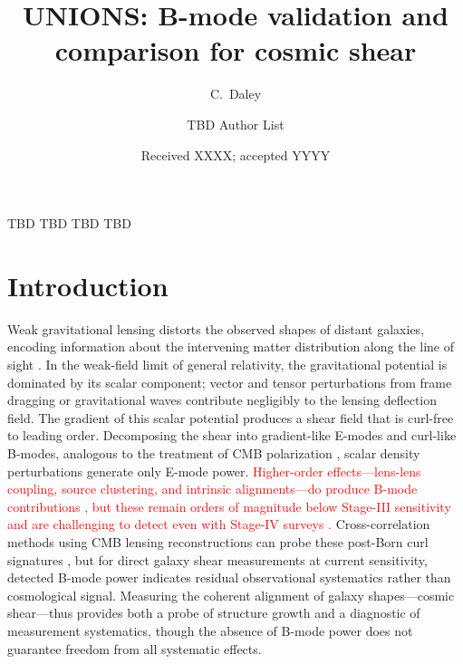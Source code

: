 \documentclass{aa}
\begin{document}
   \title{UNIONS: B-mode validation and comparison for cosmic shear}

   \author{C.~Daley
          \and
          TBD Author List
          }


   \date{Received XXXX; accepted YYYY}

  \abstract
   {TBD}
   {TBD}
   {TBD}
   {TBD}
   {}


   \maketitle
%

\section{Introduction}
Weak gravitational lensing distorts the observed shapes of distant galaxies, encoding information about the intervening matter distribution along the line of sight \citep{bacon.etal00, kaiser.etal00, vanwaerbeke.etal00, wittman.etal00}. In the weak-field limit of general relativity, the gravitational potential is dominated by its scalar component; vector and tensor perturbations from frame dragging or gravitational waves contribute negligibly to the lensing deflection field. The gradient of this scalar potential produces a shear field that is curl-free to leading order. Decomposing the shear into gradient-like E-modes and curl-like B-modes, analogous to the treatment of CMB polarization \citep{stebbins96, kamionkowski.etal97, crittenden.etal02}, scalar density perturbations generate only E-mode power. \textcolor{red}{Higher-order effects—lens-lens coupling, source clustering, and intrinsic alignments—do produce B-mode contributions \citep{cooray.hu01, schneider.etal02, hilbert.etal09}, but these remain orders of magnitude below Stage-III sensitivity and are challenging to detect even with Stage-IV surveys \citep{schneider.etal22}.} Cross-correlation methods using CMB lensing reconstructions can probe these post-Born curl signatures \citep{robertson.etal25}, but for direct galaxy shear measurements at current sensitivity, detected B-mode power indicates residual observational systematics rather than cosmological signal. Measuring the coherent alignment of galaxy shapes—cosmic shear—thus provides both a probe of structure growth and a diagnostic of measurement systematics, though the absence of B-mode power does not guarantee freedom from all systematic effects.
\end{document}
